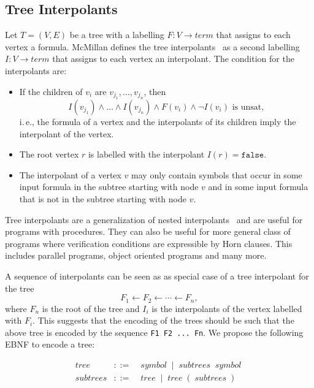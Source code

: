 \documentclass[a4paper,12pt]{article}
\begin{document}
\subsection{Tree Interpolants}

Let $T=(V,E)$ be a tree with a labelling $F : V \to \mathit{term}$
that assigns to each vertex a formula.  McMillan defines the tree
interpolants~\cite{z3 homepage} as a second labelling $I: V\to
\mathit{term}$ that assigns to each vertex an interpolant.  The
condition for the interpolants are:
\begin{itemize}
\item
  If the children of $v_i$ are $v_{j_1},\dots,v_{j_n}$, then
  \[I(v_{j_1})\land \dots \land I(v_{j_n}) \land F(v_i) \land \lnot I(v_i) \mbox{ is unsat},\]
  i.\,e., the formula of a vertex and the interpolants of its children imply the
  interpolant of the vertex.
\item The root vertex $r$ is labelled with the interpolant
  $I(r)=\mathtt{false}$.
\item The interpolant of a vertex $v$ may only contain symbols that occur
  in some input formula in the subtree starting with node $v$ and in
  some input formula that is not in the subtree starting with node $v$.
\end{itemize}

Tree interpolants are a generalization of nested
interpolants~\cite{TODO} and are useful for programs with procedures.
They can also be useful for more general class of programs where
verification conditions are expressible by Horn clauses.  This
includes parallel programs, object oriented programs and many more.

A sequence of interpolants can be seen as as special case of a tree
interpolant for the tree
\[ F_1 \longleftarrow F_2 \longleftarrow \cdots \longleftarrow F_n,\]
where $F_n$ is the root of the tree and $I_i$ is the interpolants of
the vertex labelled with $F_i$.  This suggests that the encoding of
the trees should be such that the above tree is encoded by the
sequence \verb+F1 F2 ... Fn+.  We propose the following EBNF
to encode a tree:

\def\nt#1{\mathop{\mathit{#1}}} %

\begin{eqnarray*}
  \nt{tree}&::=&\nt{symbol}\mathrel{|}\nt{subtrees} \nt{symbol}\\
  \nt{subtrees}&::=&\nt{tree} \mathrel{|} \nt{tree} ( \nt{subtrees} ) \\
\end{eqnarray*}
\end{document}
